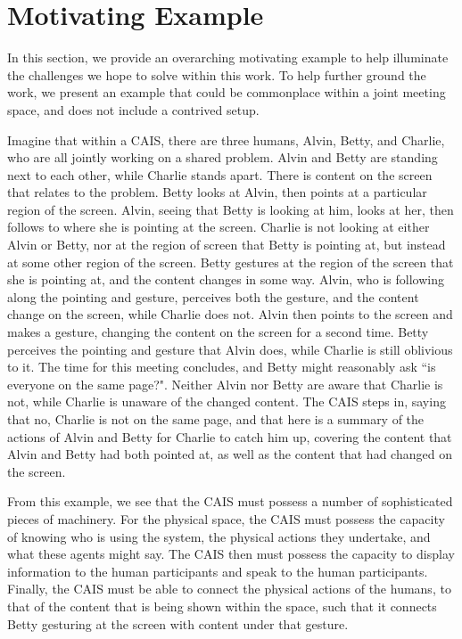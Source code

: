 \section{Motivating Example}

In this section, we provide an overarching motivating example to help
illuminate the challenges we hope to solve within this work. To help further
ground the work, we present an example that could be commonplace within a joint
meeting space, and does not include a contrived setup.

Imagine that within a CAIS, there are three humans, Alvin, Betty, and Charlie,
who are all jointly working on a shared problem. Alvin and Betty are standing
next to each other, while Charlie stands apart. There is content on the screen
that relates to the problem. Betty looks at Alvin, then points at a particular
region of the screen. Alvin, seeing that Betty is looking at him, looks at her,
then follows to where she is pointing at the screen. Charlie is not looking at
either Alvin or Betty, nor at the region of screen that Betty is pointing at,
but instead at some other region of the screen. Betty gestures at the region of
the screen that she is pointing at, and the content changes in some way. Alvin,
who is following along the pointing and gesture, perceives both the gesture, and
the content change on the screen, while Charlie does not. Alvin then points to
the screen and makes a gesture, changing the content on the screen for a second
time. Betty perceives the pointing and gesture that Alvin does, while Charlie is
still oblivious to it. The time for this meeting concludes, and Betty
might
reasonably ask ``is everyone on the same page?". Neither Alvin nor
Betty are aware that Charlie is not, while Charlie is unaware of the
changed content. The CAIS steps in, saying that no, Charlie is not on
the same page, and that here is a summary of the actions of Alvin and
Betty for Charlie to catch him up, covering the content that Alvin and
Betty had both pointed at, as well as the content that had changed on
the screen.

From this example, we see that the CAIS must possess a number of
sophisticated pieces of machinery. For the physical space, the CAIS
must possess the capacity of knowing who is using the system, the
physical actions they undertake, and what these agents might say. The
CAIS then must possess the capacity to display information to the
human participants and speak to the human participants. Finally, the
CAIS must be able to connect the physical actions of the humans, to
that of the content that is being shown within the space, such that it
connects Betty gesturing at the screen with content under that
gesture.
